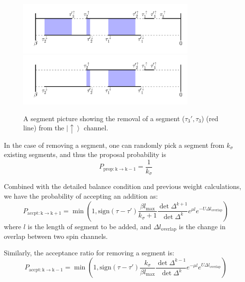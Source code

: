 \begin{figure}[ht]
  \centering
  \includegraphics[width=0.8\textwidth] {img/segment.png}
  \includegraphics[width=0.8\textwidth] {img/segment_remove.png}
  \caption{A segment picture showing the removal of a segment ($\tau_3',\tau_3$)
(red line) from the $\left|\uparrow\right\rangle$ channel.
}

\label{fig:seg_remove}
\end{figure}
In the case of removing a segment, one can randomly pick a segment from $k_\sigma$ 
existing segments, and thus the proposal probability is 
\begin{equation}
P_\mathrm{prop:k\rightarrow k-1}=\frac{1}{k_\sigma}
\end{equation}

Combined with the detailed balance condition and previous weight calculations, 
we have the probability of accepting an addition as:
\begin{equation}
P_\mathrm{accpt:k\rightarrow k+1}=\min\left(1,\mathrm{sign}(\tau-\tau')
  \frac{\beta l_\mathrm{max}}{k_\sigma +1} \frac{\det\Delta^{k+1}}{\det\Delta^k}
  e^{\mu l}e^{-U \Delta l_\mathrm{overlap}}
\right)
\end{equation}
where $l$ is the length of segment to be added, and $\Delta l_\mathrm{overlap}$
is the change in overlap between two spin channels. 

Similarly, the acceptance ratio for removing a segment is:
\begin{equation}
P_\mathrm{accpt:k\rightarrow k-1}=\min\left(1,\mathrm{sign}(\tau-\tau')
  \frac{k_\sigma}{\beta l_\mathrm{max}} \frac{\det\Delta^{k-1}}{\det\Delta^k}
  e^{-\mu l}e^{U \Delta l_\mathrm{overlap}}
\right)
\end{equation}

